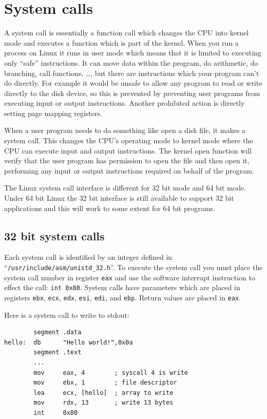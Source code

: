 \documentclass[11pt,b5paper]{book}
\begin{document}
\chapter{System calls}

A system call is essentially a function call which changes the CPU into kernel mode and executes 
a function which is part of the kernel.  
When you run a process on Linux it runs in user mode which means that it is limited to executing
only ``safe'' instructions.
It can move data within the program, do arithmetic, do branching, call functions, \ldots, but there
are instructions which your program can't do directly.
For example it would be unsafe to allow any program to read or write directly to the disk device, so
this is prevented by preventing user programs from executing input or output instructions.
Another prohibited action is directly setting page mapping registers.

When a user program needs to do something like open a disk file, it makes a system call.
This changes the CPU's operating mode to kernel mode where the CPU can execute input and output
instructions.
The kernel open function will verify that the user program has permission to open the file and then
open it, performing any input or output instructions required on behalf of the program.

The Linux system call interface is different for 32 bit mode and 64 bit mode.
Under 64 bit Linux the 32 bit interface is still available to support 32 bit applications
and this will work to some extent for 64 bit programs.

\section{32 bit system calls}

Each system call is identified by an integer defined in ``{\tt /usr/include/asm/unistd\_32.h}''.
To execute the system call you must place the system call number in register {\tt eax} and
use the software interrupt instruction to effect the call: {\tt int 0x80}.
System calls have parameters which are placed in registers {\tt ebx}, {\tt ecx},
{\tt edx}, {\tt esi}, {\tt edi}, and {\tt ebp}.
Return values are placed in {\tt eax}.

Here is a system call to write to stdout:
\begin{verbatim}
        segment .data
hello:  db      "Hello world!",0x0a
        segment .text
        ...
        mov     eax, 4        ; syscall 4 is write
        mov     ebx, 1        ; file descriptor
        lea     ecx, [hello]  ; array to write
        mov     rdx, 13       ; write 13 bytes
        int     0x80
\end{verbatim}
\end{document}
